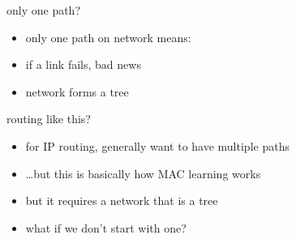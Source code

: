 \begin{frame}{only one path?}
    \begin{itemize}
    \item only one path on network means:
    \vspace{.5cm}
    \item if a link fails, bad news
    \item network forms a tree
    \end{itemize}
\end{frame}

\begin{frame}{routing like this?}
    \begin{itemize}
    \item for IP routing, generally want to have multiple paths
    \item \ldots but this is basically how MAC learning works
    \vspace{.5cm}
    \item but it requires a network that is a tree
    \item what if we don't start with one?
    \end{itemize}
\end{frame}
